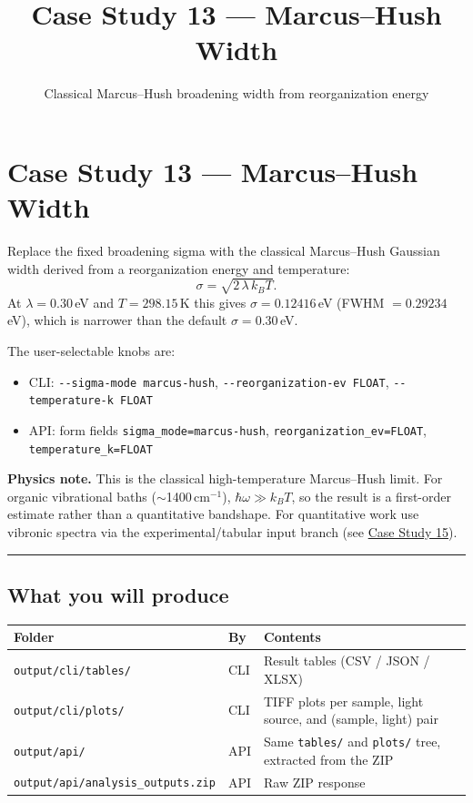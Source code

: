 \documentclass[
  11pt,
]{article}
\title{Case Study 13 --- Marcus--Hush Width}
\subtitle{Classical Marcus--Hush broadening width from reorganization energy}
\author{}
\date{}
\providecommand{\tightlist}{
  \setlength{\itemsep}{0pt}\setlength{\parskip}{0pt}}
\begin{document}
\maketitle

{
\hypersetup{linkcolor=}
\setcounter{tocdepth}{2}
\tableofcontents
}
\hypertarget{case-study-13--marcus-hush-width}{
\section{Case Study 13 --- Marcus--Hush
Width}\label{case-study-13--marcus-hush-width}}

Replace the fixed broadening sigma with the classical Marcus--Hush
Gaussian width derived from a reorganization energy and temperature:
\[
\sigma = \sqrt{2\,\lambda\,k_B T}.
\]
At \(\lambda = 0.30\)\,eV and \(T = 298.15\)\,K this gives
\(\sigma = 0.12416\)\,eV (FWHM \(= 0.29234\)\,eV), which is narrower
than the default \(\sigma = 0.30\)\,eV.

The user-selectable knobs are:
\begin{itemize}
\tightlist
\item
  CLI: \texttt{-{}-sigma-mode marcus-hush},
  \texttt{-{}-reorganization-ev FLOAT},
  \texttt{-{}-temperature-k FLOAT}
\item
  API: form fields \texttt{sigma\_mode=marcus-hush},
  \texttt{reorganization\_ev=FLOAT}, \texttt{temperature\_k=FLOAT}
\end{itemize}

\textbf{Physics note.} This is the classical high-temperature
Marcus--Hush limit. For organic vibrational baths
(\(\sim\)1400\,cm\(^{-1}\)), \(\hbar\omega \gg k_B T\), so the result
is a first-order estimate rather than a quantitative bandshape. For
quantitative work use vibronic spectra via the experimental/tabular
input branch (see
\href{https://github.com/pinarsyt/overlap-calculator/blob/main/case_studies/15_vibronic_tabular_branch/README.md}{Case
Study 15}).

\begin{center}\rule{0.5\linewidth}{0.5pt}\end{center}

\hypertarget{what-you-will-produce}{
\subsection{What you will produce}\label{what-you-will-produce}}

\begin{longtable}[]{@{}lll@{}}
\toprule
Folder & By & Contents \\
\midrule
\endhead
\texttt{output/cli/tables/} & CLI & Result tables (CSV / JSON / XLSX) \\
\texttt{output/cli/plots/} & CLI & TIFF plots per sample, light source,
and (sample, light) pair \\
\texttt{output/api/} & API & Same \texttt{tables/} and \texttt{plots/}
tree, extracted from the ZIP \\
\texttt{output/api/analysis\_outputs.zip} & API & Raw ZIP response \\
\bottomrule
\end{longtable}
\end{document}
